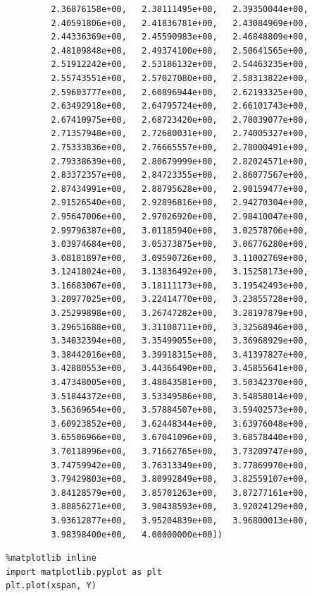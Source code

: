 \documentclass[11pt]{article}
\begin{document}
\begin{verbatim}
         2.36876158e+00,   2.38111495e+00,   2.39350044e+00,
         2.40591806e+00,   2.41836781e+00,   2.43084969e+00,
         2.44336369e+00,   2.45590983e+00,   2.46848809e+00,
         2.48109848e+00,   2.49374100e+00,   2.50641565e+00,
         2.51912242e+00,   2.53186132e+00,   2.54463235e+00,
         2.55743551e+00,   2.57027080e+00,   2.58313822e+00,
         2.59603777e+00,   2.60896944e+00,   2.62193325e+00,
         2.63492918e+00,   2.64795724e+00,   2.66101743e+00,
         2.67410975e+00,   2.68723420e+00,   2.70039077e+00,
         2.71357948e+00,   2.72680031e+00,   2.74005327e+00,
         2.75333836e+00,   2.76665557e+00,   2.78000491e+00,
         2.79338639e+00,   2.80679999e+00,   2.82024571e+00,
         2.83372357e+00,   2.84723355e+00,   2.86077567e+00,
         2.87434991e+00,   2.88795628e+00,   2.90159477e+00,
         2.91526540e+00,   2.92896816e+00,   2.94270304e+00,
         2.95647006e+00,   2.97026920e+00,   2.98410047e+00,
         2.99796387e+00,   3.01185940e+00,   3.02578706e+00,
         3.03974684e+00,   3.05373875e+00,   3.06776280e+00,
         3.08181897e+00,   3.09590726e+00,   3.11002769e+00,
         3.12418024e+00,   3.13836492e+00,   3.15258173e+00,
         3.16683067e+00,   3.18111173e+00,   3.19542493e+00,
         3.20977025e+00,   3.22414770e+00,   3.23855728e+00,
         3.25299898e+00,   3.26747282e+00,   3.28197879e+00,
         3.29651688e+00,   3.31108711e+00,   3.32568946e+00,
         3.34032394e+00,   3.35499055e+00,   3.36968929e+00,
         3.38442016e+00,   3.39918315e+00,   3.41397827e+00,
         3.42880553e+00,   3.44366490e+00,   3.45855641e+00,
         3.47348005e+00,   3.48843581e+00,   3.50342370e+00,
         3.51844372e+00,   3.53349586e+00,   3.54858014e+00,
         3.56369654e+00,   3.57884507e+00,   3.59402573e+00,
         3.60923852e+00,   3.62448344e+00,   3.63976048e+00,
         3.65506966e+00,   3.67041096e+00,   3.68578440e+00,
         3.70118996e+00,   3.71662765e+00,   3.73209747e+00,
         3.74759942e+00,   3.76313349e+00,   3.77869970e+00,
         3.79429803e+00,   3.80992849e+00,   3.82559107e+00,
         3.84128579e+00,   3.85701263e+00,   3.87277161e+00,
         3.88856271e+00,   3.90438593e+00,   3.92024129e+00,
         3.93612877e+00,   3.95204839e+00,   3.96800013e+00,
         3.98398400e+00,   4.00000000e+00])
\end{verbatim}

\begin{verbatim}
%matplotlib inline
import matplotlib.pyplot as plt
plt.plot(xspan, Y)
\end{verbatim}
\end{document}
